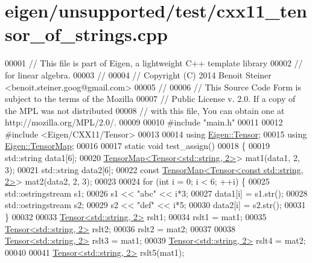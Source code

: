 \hypertarget{eigen_2unsupported_2test_2cxx11__tensor__of__strings_8cpp_source}{}\section{eigen/unsupported/test/cxx11\+\_\+tensor\+\_\+of\+\_\+strings.cpp}
\label{eigen_2unsupported_2test_2cxx11__tensor__of__strings_8cpp_source}

\begin{DoxyCode}
00001 \textcolor{comment}{// This file is part of Eigen, a lightweight C++ template library}
00002 \textcolor{comment}{// for linear algebra.}
00003 \textcolor{comment}{//}
00004 \textcolor{comment}{// Copyright (C) 2014 Benoit Steiner <benoit.steiner.goog@gmail.com>}
00005 \textcolor{comment}{//}
00006 \textcolor{comment}{// This Source Code Form is subject to the terms of the Mozilla}
00007 \textcolor{comment}{// Public License v. 2.0. If a copy of the MPL was not distributed}
00008 \textcolor{comment}{// with this file, You can obtain one at http://mozilla.org/MPL/2.0/.}
00009 
00010 \textcolor{preprocessor}{#include "main.h"}
00011 
00012 \textcolor{preprocessor}{#include <Eigen/CXX11/Tensor>}
00013 
00014 \textcolor{keyword}{using} \hyperlink{class_eigen_1_1_tensor}{Eigen::Tensor};
00015 \textcolor{keyword}{using} \hyperlink{class_eigen_1_1_tensor_map}{Eigen::TensorMap};
00016 
00017 \textcolor{keyword}{static} \textcolor{keywordtype}{void} test\_assign()
00018 \{
00019   std::string data1[6];
00020   \hyperlink{class_eigen_1_1_tensor_map}{TensorMap<Tensor<std::string, 2>}> mat1(data1, 2, 3);
00021   std::string data2[6];
00022   \textcolor{keyword}{const} \hyperlink{class_eigen_1_1_tensor_map}{TensorMap<Tensor<const std::string, 2>}> mat2(data2, 2, 3);
00023 
00024   \textcolor{keywordflow}{for} (\textcolor{keywordtype}{int} i = 0; i < 6; ++i) \{
00025     std::ostringstream s1;
00026     s1 << \textcolor{stringliteral}{"abc"} << i*3;
00027     data1[i] = s1.str();
00028     std::ostringstream s2;
00029     s2 << \textcolor{stringliteral}{"def"} << i*5;
00030     data2[i] = s2.str();
00031   \}
00032 
00033   \hyperlink{class_eigen_1_1_tensor}{Tensor<std::string, 2>} rslt1;
00034   rslt1 = mat1;
00035   \hyperlink{class_eigen_1_1_tensor}{Tensor<std::string, 2>} rslt2;
00036   rslt2 = mat2;
00037 
00038   \hyperlink{class_eigen_1_1_tensor}{Tensor<std::string, 2>} rslt3 = mat1;
00039   \hyperlink{class_eigen_1_1_tensor}{Tensor<std::string, 2>} rslt4 = mat2;
00040 
00041   \hyperlink{class_eigen_1_1_tensor}{Tensor<std::string, 2>} rslt5(mat1);

\end{DoxyCode}
